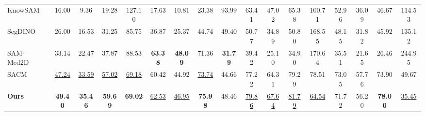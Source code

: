 \begin{table}[t]
\begin{tabular*}{\textwidth}{@{\extracolsep{\fill}}lcccccccccccccccc@{}}
KnowSAM~\cite{huang2025knowsam} & 16.00 & 9.36 & 19.28 & 127.10 & 17.63 & 10.81 & 23.38 & 93.99 & 63.41 & 47.02 & 65.38 & 100.71 & 52.96 & 36.09 & 46.67 & 114.53 \\
SegDINO~\cite{yang2025segdino} & 26.00 & 16.53 & 31.25 & 85.75 & 36.87 & 25.37 & 44.74 & 49.40 & 50.77 & 34.89 & 50.80 & 168.55 & 48.15 & 31.82 & 45.92 & 135.12 \\
SAM-Med2D~\cite{cheng2023sammed2d} & 33.14 & 22.47 & 37.87 & 88.53 & \textcolor{red!80!black}{\textbf{63.38}} & \textcolor{red!80!black}{\textbf{48.09}} & 71.36 & \textcolor{red!80!black}{\textbf{31.79}} & 39.42 & 25.10 & 34.90 & 170.64 & 35.51 & 21.65 & 26.46 & 244.95 \\
SACM~\cite{zhu2026sacm} & \underline{47.24} & \underline{33.59} & \underline{57.02} & \underline{69.18} & 60.42 & 44.92 & \underline{73.74} & 44.66 & 77.22 & 64.31 & 79.29 & 78.51 & 73.05 & 57.76 & 73.90 & 49.67 \\
\midrule
\textbf{Ours} & \textcolor{red!80!black}{\textbf{49.40}} & \textcolor{red!80!black}{\textbf{35.46}} & \textcolor{red!80!black}{\textbf{59.69}} & \textcolor{red!80!black}{\textbf{69.02}} & \underline{62.53} & \underline{46.95} & \textcolor{red!80!black}{\textbf{75.98}} & 48.46 & \underline{79.86} & \underline{67.64} & \underline{81.79} & \underline{64.54} & 71.72 & 56.20 & \textcolor{red!80!black}{\textbf{78.00}} & \underline{35.45} \\
\bottomrule
\end{tabular*}
\end{table}

